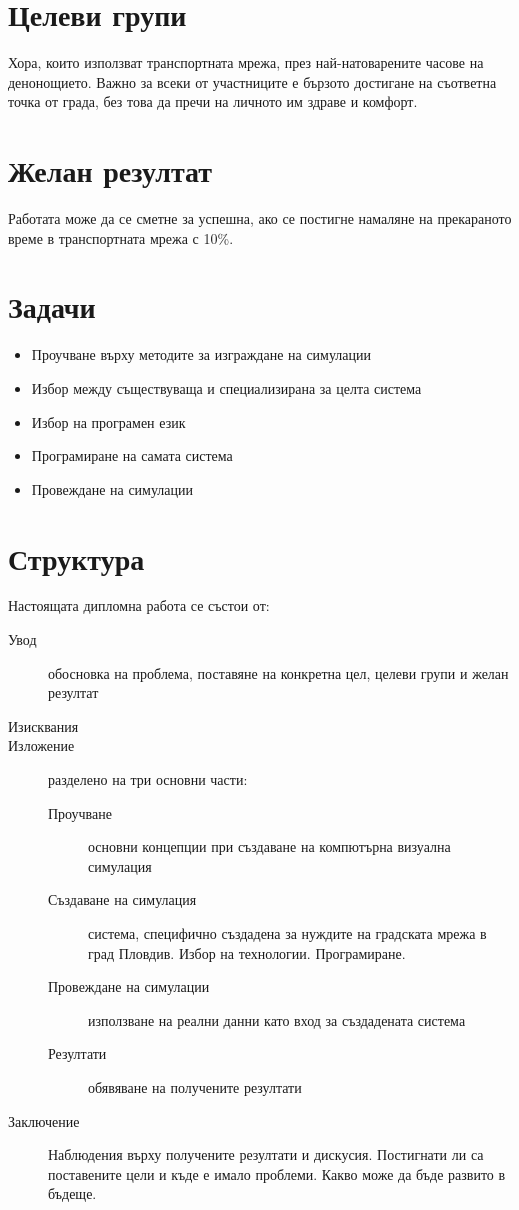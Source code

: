 	\section{Целеви групи}
	
		Хора, които използват транспортната мрежа, през най-натоварените часове на денонощието. Важно за всеки от участниците е бързото достигане на съответна точка от града, без това да пречи на личното им здраве и комфорт.
	
	\section{Желан резултат}
	
		Работата може да се сметне за успешна, ако се постигне намаляне на прекараното време в транспортната мрежа с 10\%.
	
	\section{Задачи}
	
		\begin{itemize}
			\item Проучване върху методите за изграждане на симулации
			\item Избор между съществуваща и специализирана за целта система
			\item Избор на програмен език
			\item Програмиране на самата система
			\item Провеждане на симулации
		\end{itemize}
	
	\section{Структура}
	
		Настоящата дипломна работа се състои от:
	
		\begin{description}
			\item[Увод] обосновка на проблема, поставяне на конкретна цел, целеви групи и желан резултат
			\item[Изисквания]
			\item[Изложение] разделено на три основни части:
			\begin{description}			
				\item[Проучване] основни концепции при създаване на компютърна визуална симулация
				\item[Създаване на симулация] система, специфично създадена за нуждите на градската мрежа в град Пловдив. 
				Избор на технологии. Програмиране.
				\item[Провеждане на симулации] използване на реални данни като вход за създадената система
				\item[Резултати] обявяване на получените резултати			
			\end{description}		
			\item[Заключение] Наблюдения върху получените резултати и дискусия. 
			Постигнати ли са поставените цели и къде е имало проблеми. Какво може да бъде развито в бъдеще.
		\end{description}